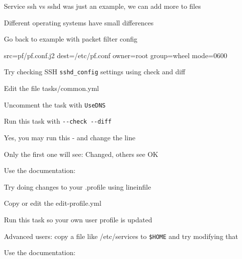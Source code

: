 \documentclass[18pt,landscape,a4paper,footrule]{foils}
\begin{document}
\begin{list2}
\item Service ssh vs sshd was just an example, we can add more to files
\item Different operating systems have small differences
\end{list2}



Go back to example with packet filter config

 src=pf/pf.conf.j2
        dest=/etc/pf.conf owner=root group=wheel mode=0600




Try checking SSH \verb+sshd_config+ settings using check and diff

\begin{list2}
\item Edit the file tasks/common.yml
\item Uncomment the task with \verb+UseDNS+
\item Run this task with \verb+--check --diff+
\item Yes, you may run this - and change the line
\item Only the first one will see: Changed, others see OK
\end{list2}

Use the documentation:\\





Try doing changes to your .profile using lineinfile

\begin{list2}
\item Copy or edit the edit-profile.yml
\item Run this task so your own user profile is updated
\item Advanced users: copy a file like /etc/services to \verb+$HOME+ and try modifying that
\item
\end{list2}

Use the documentation:\\



\end{document}

